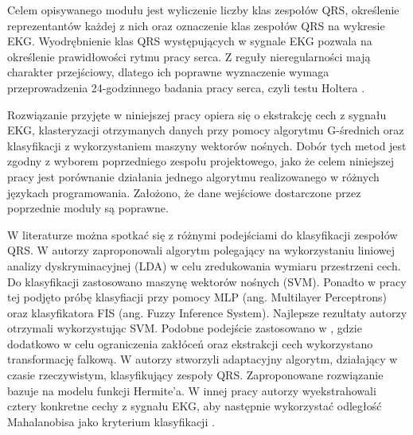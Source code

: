 Celem opisywanego modułu jest wyliczenie liczby klas zespołów QRS, określenie reprezentantów każdej z nich oraz oznaczenie klas zespołów QRS na wykresie EKG. Wyodrębnienie klas QRS występujących w sygnale EKG pozwala na określenie prawidłowości rytmu pracy serca. Z reguły nieregularności mają charakter przejściowy, dlatego ich poprawne wyznaczenie wymaga przeprowadzenia 24-godzinnego badania pracy serca, czyli testu Holtera \cite{RaportKoncowy}.

Rozwiązanie przyjęte w niniejszej pracy opiera się o ekstrakcję cech z sygnału EKG, klasteryzacji otrzymanych danych przy pomocy algorytmu G-średnich oraz klasyfikacji z wykorzystaniem maszyny wektorów nośnych. Dobór tych metod jest zgodny z wyborem poprzedniego zespołu projektowego, jako że celem niniejszej pracy jest porównanie działania jednego algorytmu realizowanego w różnych językach programowania.
Założono, że dane wejściowe dostarczone przez poprzednie moduły są poprawne.

W literaturze można spotkać się z różnymi podejściami do klasyfikacji zespołów QRS. W \cite{SVMBasedArrhythmiaClassification} autorzy zaproponowali algorytm polegający na wykorzystaniu liniowej analizy dyskryminacyjnej (LDA) w celu zredukowania wymiaru przestrzeni cech. Do klasyfikacji zastosowano maszynę wektorów nośnych (SVM). Ponadto w pracy tej podjęto próbę klasyfiacji przy pomocy MLP (ang. Multilayer Perceptrons) oraz klasyfikatora FIS (ang. Fuzzy Inference System). Najlepsze rezultaty autorzy otrzymali wykorzystując SVM. Podobne podejście zastosowano w \cite{Abhishek}, gdzie dodatkowo w celu ograniczenia zakłóceń oraz ekstrakcji cech wykorzystano transformację falkową. 
W \cite{Laguna} autorzy stworzyli adaptacyjny algorytm, działający w czasie rzeczywistym, klasyfikujący zespoły QRS. Zaproponowane rozwiązanie bazuje na modelu funkcji Hermite'a. 
W innej pracy autorzy wyekstrahowali cztery konkretne cechy z sygnału EKG, aby następnie wykorzystać odległość Mahalanobisa jako kryterium klasyfikacji \cite{Moreas}.
